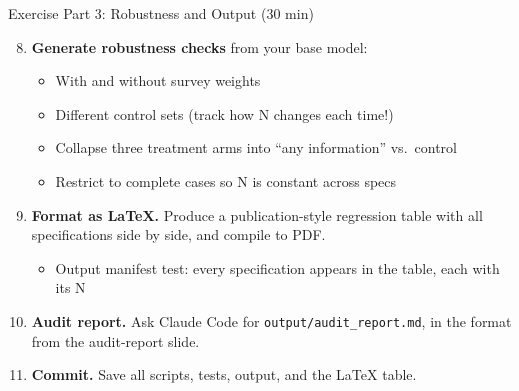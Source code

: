 \begin{frame}{Exercise Part 3: Robustness and Output (30 min)}
  \begin{enumerate}
    \setcounter{enumi}{7}
    \item \textbf{Generate robustness checks} from your base model:
    \begin{itemize}
      \item With and without survey weights
      \item Different control sets (track how N changes each time!)
      \item Collapse three treatment arms into ``any information'' vs.\ control
      \item Restrict to complete cases so N is constant across specs
    \end{itemize}

    \vspace{0.3em}
    \item \textbf{Format as \LaTeX.} Produce a publication-style regression table with all specifications side by side, and compile to PDF.
    \begin{itemize}
      \small
      \item Output manifest test: every specification appears in the table, each with its N
    \end{itemize}

    \vspace{0.3em}
    \item \textbf{Audit report.} Ask Claude Code for \texttt{output/audit\_report.md}, in the format from the audit-report slide.

    \vspace{0.3em}
    \item \textbf{Commit.} Save all scripts, tests, output, and the \LaTeX{} table.
  \end{enumerate}
\end{frame}

